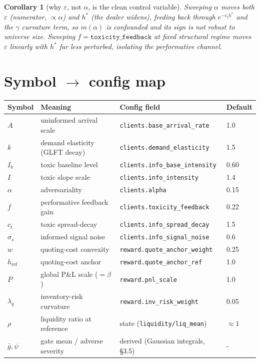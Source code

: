 \documentclass[11pt]{article}
\newtheorem{corollary}{Corollary}
\newcommand{\eps}{\varepsilon}
\newcommand{\gbar}{\bar g}
\newcommand{\href}{h_{\mathrm{ref}}}
\newcommand{\code}[1]{\texttt{#1}}
\begin{document}
\begin{corollary}[why $\eps$, not $\alpha$, is the clean control variable]
Sweeping $\alpha$ moves both $\eps$ (numerator, $\propto\alpha$) and $h^*$ (the
dealer widens), feeding back through $e^{-c_t h^*}$ and the $\gamma$ curvature
term, so $m(\alpha)$ is confounded and its sign is not robust to universe size.
Sweeping $f=\code{toxicity\_feedback}$ at fixed structural regime moves $\eps$
linearly with $h^*$ far less perturbed, isolating the performative channel.
\end{corollary}

\section{Symbol \texorpdfstring{$\to$}{->} config map}

\begin{center}
\begin{tabular}{@{}llll@{}}
\toprule
Symbol & Meaning & Config field & Default \\
\midrule
$A$        & uninformed arrival scale          & \code{clients.base\_arrival\_rate} & 1.0 \\
$k$        & demand elasticity (GLFT decay)    & \code{clients.demand\_elasticity}  & 1.5 \\
$I_b$      & toxic baseline level              & \code{clients.info\_base\_intensity} & 0.60 \\
$I$        & toxic slope scale                 & \code{clients.info\_intensity}     & 1.4 \\
$\alpha$   & adversariality                    & \code{clients.alpha}               & 0.15 \\
$f$        & performative feedback gain        & \code{clients.toxicity\_feedback}  & 0.22 \\
$c_t$      & toxic spread-decay                & \code{clients.info\_spread\_decay} & 1.5 \\
$\sigma_s$ & informed signal noise             & \code{clients.info\_signal\_noise} & 0.6 \\
$w$        & quoting-cost convexity            & \code{reward.quote\_anchor\_weight}& 0.25 \\
$\href$    & quoting-cost anchor               & \code{reward.quote\_anchor\_ref}   & 1.0 \\
$P$        & global P\&L scale ($=\beta$)       & \code{reward.pnl\_scale}           & 1.0 \\
$\lambda_q$& inventory-risk curvature          & \code{reward.inv\_risk\_weight}    & 0.05 \\
$\rho$     & liquidity ratio at reference      & state (\code{liquidity/liq\_mean}) & $\approx 1$ \\
$\gbar,\psi$ & gate mean / adverse severity    & derived (Gaussian integrals, \S3.5)& - \\
\bottomrule
\end{tabular}
\end{center}
\end{document}
